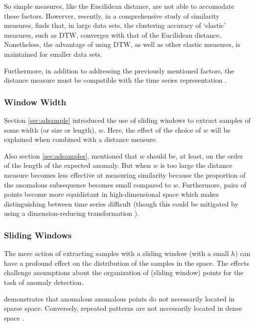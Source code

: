 So simple measures, like the Eucilidean distance, are not able to accomodate these factors. Howerver, recently, in a comprehensive study of similarity measures, \cite{Wang2013} finds that, in large data sets, the clustering accuracy of `elastic' measures, such as DTW, converges with that of the Eucilidean distance. Nonetheless, the advantage of using DTW, as well as other elastic measures, is maintained for smaller data sets.

Furthermore, in addition to addressing the previously mentioned factors, the distance measure must be compatible with the time series representation \cite{Chakrabarti2002}. 


\subsubsection{Window Width}

Section \ref{sec:adsample} introduced the use of sliding windows to extract samples of some width (or size or length), $w$. Here, the effect of the choice of $w$ will be explained when combined with a distance measure.

Also section \ref{sec:adsamples}, mentioned that $w$ should be, at least, on the order of the length of the expected anomaly. But when $w$ is too large the distance measure becomes less effective at measuring similarity because the proportion of the anomalous subsequence becomes small compared to $w$. Furthermore, pairs of points become more equidistant in high-dimensional space \cite{Hinneburg2000,Beyer1999} which makes distinguishing between time series difficult (though this could be mitigated by using a dimension-reducing transformation \cite{Keogh2001}).


\subsubsection{Sliding Windows}
\label{sec:sliding}

The mere action of extracting samples with a sliding window (with a small $h$) can have a profound effect on the distribution of the samples in the space. The effects challenge assumptions about the organization of (sliding window) points for the task of anomaly detection.

\cite{Keogh2005} demonstrates that anomalous anomalous points do not necessarily located in sparse space. Conversely, repeated patterns are not necessarily located in dense space \cite{kitaguchi2004extracting,Chiu2003,Bentley1997}.

